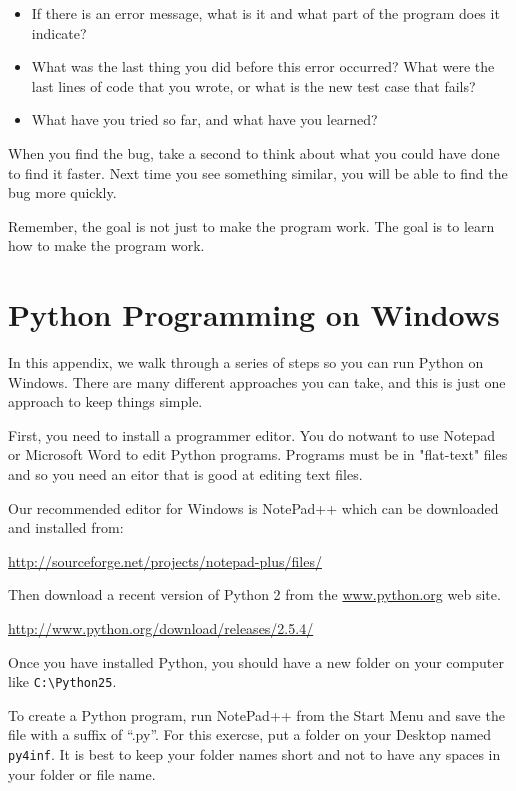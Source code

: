 \documentclass[10pt]{book}
\begin{document}
\begin{itemize}

\item If there is an error message, what is it
and what part of the program does it indicate?

\item What was the last thing you did before this error occurred?
What were the last lines of code that you wrote, or what is
the new test case that fails?

\item What have you tried so far, and what have you learned?

\end{itemize}

When you find the bug, take a second to think about what you
could have done to find it faster.  Next time you see something
similar, you will be able to find the bug more quickly.

Remember, the goal is not just to make the program
work.  The goal is to learn how to make the program work.

\chapter{Python Programming on Windows}

In this appendix, we walk through a series of steps
so you can run Python on Windows.  There are many different 
approaches you can take, and this is just one
approach to keep things simple.

First, you need to install a programmer editor.  You
do notwant to use Notepad or Microsoft Word to edit
Python programs.  Programs must be in "flat-text" files
and so you need an eitor that is good at
editing text files.

Our recommended editor for Windows is NotePad++ which
can be downloaded and installed from:

\url{http://sourceforge.net/projects/notepad-plus/files/}

Then download a recent version of Python 2 from the
\url{www.python.org} web site.

\url{http://www.python.org/download/releases/2.5.4/}

Once you have installed Python, you should have a new
folder on your computer like {\tt C:{\textbackslash}Python25}.

To create a Python program, run NotePad++ from the Start Menu
and save the file with a suffix of ``.py''.  For this
exercse, put a folder on your Desktop named 
{\tt py4inf}.  It is best to keep your folder names short
and not to have any spaces in your folder or file name.
\end{document}
